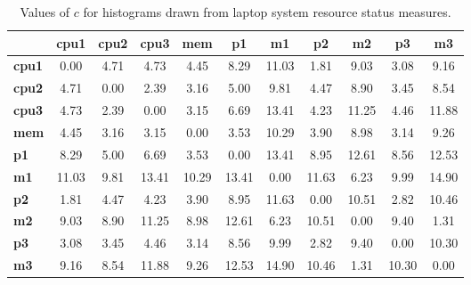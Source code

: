 \begin{table}[h!]
\scriptsize
\begin{center}
\begin{tabular}{| l | c | c | c || c || c | c || c | c || c | c ||}\hline
 & {\bf cpu1} & {\bf cpu2} & {\bf cpu3} & {\bf mem} & {\bf p1} & {\bf m1} & {\bf p2} & {\bf m2} & {\bf p3} & {\bf m3} \\\hline
{\bf cpu1} & 0.00 & 4.71 & 4.73 & 4.45 & 8.29 & 11.03 & 1.81 & 9.03 & 3.08 & 9.16 \\\hline
{\bf cpu2} & 4.71 & 0.00 & 2.39 & 3.16 & 5.00 & 9.81 & 4.47 & 8.90 & 3.45 & 8.54 \\\hline
{\bf cpu3} & 4.73 & 2.39 & 0.00 & 3.15 & 6.69 & 13.41 & 4.23 & 11.25 & 4.46 & 11.88 \\\hline\hline
{\bf mem} & 4.45 & 3.16 & 3.15 & 0.00 & 3.53 & 10.29 & 3.90 & 8.98 & 3.14 & 9.26 \\\hline\hline
{\bf p1} & 8.29 & 5.00 & 6.69 & 3.53 & 0.00 & 13.41 & 8.95 & 12.61 & 8.56 & 12.53 \\\hline
{\bf m1} & 11.03 & 9.81 & 13.41 & 10.29 & 13.41 & 0.00 & 11.63 & 6.23 & 9.99 & 14.90 \\\hline\hline
{\bf p2} & 1.81 & 4.47 & 4.23 & 3.90 & 8.95 & 11.63 & 0.00 & 10.51 & 2.82 & 10.46 \\\hline
{\bf m2} & 9.03 & 8.90 & 11.25 & 8.98 & 12.61 & 6.23 & 10.51 & 0.00 & 9.40 & 1.31 \\\hline\hline
{\bf p3} & 3.08 & 3.45 & 4.46 & 3.14 & 8.56 & 9.99 & 2.82 & 9.40 & 0.00 & 10.30 \\\hline
{\bf m3} & 9.16 & 8.54 & 11.88 & 9.26 & 12.53 & 14.90 & 10.46 & 1.31 & 10.30 & 0.00 \\\hline\hline
\end{tabular}
\caption{Values of $c$ for histograms drawn from laptop system resource status measures.}
\end{center}
\end{table}